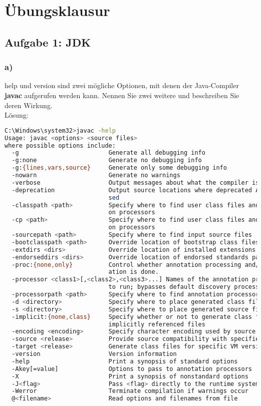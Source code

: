 \documentclass[a4paper, 10pt]{article}
\begin{document}
\section*{Übungsklausur}
\subsection*{Aufgabe 1: JDK}
\subsubsection*{a)}
help und version sind zwei mögliche Optionen, mit denen der Java-Compiler \textbf{javac}
aufgerufen werden kann. Nennen Sie zwei weitere und beschreiben Sie deren Wirkung.\\

Lösung:\\
\begin{lstlisting}[language=bash]
C:\Windows\system32>javac -help
Usage: javac <options> <source files>
where possible options include:
  -g                         Generate all debugging info
  -g:none                    Generate no debugging info
  -g:{lines,vars,source}     Generate only some debugging info
  -nowarn                    Generate no warnings
  -verbose                   Output messages about what the compiler is doing
  -deprecation               Output source locations where deprecated APIs are u 
                             sed
  -classpath <path>          Specify where to find user class files and annotati
                             on processors
  -cp <path>                 Specify where to find user class files and annotati
                             on processors
  -sourcepath <path>         Specify where to find input source files
  -bootclasspath <path>      Override location of bootstrap class files
  -extdirs <dirs>            Override location of installed extensions
  -endorseddirs <dirs>       Override location of endorsed standards path
  -proc:{none,only}          Control whether annotation processing and/or compil
                             ation is done.
  -processor <class1>[,<class2>,<class3>...] Names of the annotation processors
                             to run; bypasses default discovery process
  -processorpath <path>      Specify where to find annotation processors
  -d <directory>             Specify where to place generated class files
  -s <directory>             Specify where to place generated source files
  -implicit:{none,class}     Specify whether or not to generate class files for
                             implicitly referenced files
  -encoding <encoding>       Specify character encoding used by source files
  -source <release>          Provide source compatibility with specified release
  -target <release>          Generate class files for specific VM version
  -version                   Version information
  -help                      Print a synopsis of standard options
  -Akey[=value]              Options to pass to annotation processors
  -X                         Print a synopsis of nonstandard options
  -J<flag>                   Pass <flag> directly to the runtime system
  -Werror                    Terminate compilation if warnings occur
  @<filename>                Read options and filenames from file
\end{lstlisting}
\end{document}
